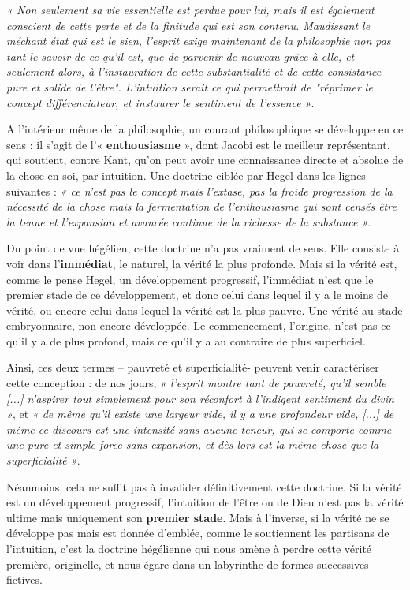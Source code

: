 {\it « Non seulement sa vie essentielle est perdue pour lui, mais il est également conscient de cette perte et de la finitude qui est son contenu. Maudissant le méchant état qui est le sien, l’esprit exige maintenant de la philosophie non pas tant le savoir de ce qu’il est, que de parvenir de nouveau grâce à elle, et seulement alors, à l’instauration de cette substantialité et de cette consistance pure et solide de l’être". L’intuition serait ce qui permettrait de "réprimer le concept différenciateur, et instaurer le sentiment de l’essence »}.

A l’intérieur même de la philosophie, un courant philosophique se développe en ce sens : il s’agit de l’« {\bf enthousiasme} », dont Jacobi est le meilleur représentant, qui soutient, contre Kant, qu’on peut avoir une connaissance directe et absolue de la chose en soi, par intuition. Une doctrine ciblée par Hegel dans les lignes suivantes : {\it « ce n’est pas le concept mais l’extase, pas la froide progression de la nécessité de la chose mais la fermentation de l’enthousiasme qui sont censés être la tenue et l’expansion et avancée continue de la richesse de la substance »}.

Du point de vue hégélien, cette doctrine n’a pas vraiment de sens. Elle consiste à voir dans l’{\bf immédiat}, le naturel, la vérité la plus profonde. Mais si la vérité est, comme le pense Hegel, un développement progressif, l’immédiat n’est que le premier stade de ce développement, et donc celui dans lequel il y a le moins de vérité, ou encore celui dans lequel la vérité est la plus pauvre. Une vérité au stade embryonnaire, non encore développée. Le commencement, l’origine, n’est pas ce qu’il y a de plus profond, mais ce qu’il y a au contraire de plus superficiel.

Ainsi, ces deux termes – pauvreté et superficialité- peuvent venir caractériser cette conception : de nos jours, {\it « l’esprit montre tant de pauvreté, qu’il semble [...] n’aspirer tout simplement pour son réconfort à l’indigent sentiment du divin »}, et {\it « de même qu’il existe une largeur vide, il y a une profondeur vide, [...] de même ce discours est une intensité sans aucune teneur, qui se comporte comme une pure et simple force sans expansion, et dès lors est la même chose que la superficialité »}.

Néanmoins, cela ne suffit pas à invalider définitivement cette doctrine. Si la vérité est un développement progressif, l’intuition de l’être ou de Dieu n’est pas la vérité ultime mais uniquement son {\bf premier stade}. Mais à l’inverse, si la vérité ne se développe pas mais est donnée d’emblée, comme le soutiennent les partisans de l’intuition, c’est la doctrine hégélienne qui nous amène à perdre cette vérité première, originelle, et nous égare dans un labyrinthe de formes successives fictives.


